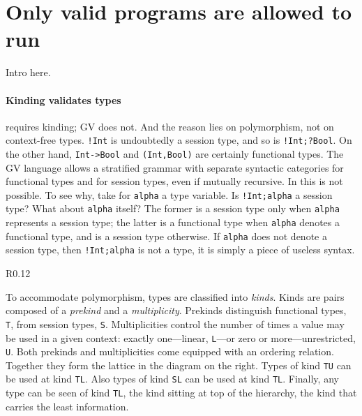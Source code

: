\section{Only valid programs are allowed to run}
\label{sec:valid}

Intro here.



\paragraph{Kinding validates types}

\freest{} requires kinding; GV does not. And the reason lies on
polymorphism, not on context-free types.
%
\lstinline|!Int| is undoubtedly a session type, and so is
\lstinline|!Int;?Bool|. On the other hand, \lstinline|Int->Bool| and
\lstinline|(Int,Bool)| are certainly functional types. The GV language
allows a stratified grammar with separate syntactic categories for
functional types and for session types, even if mutually recursive.
%
In \freest{} this is not possible.  To see why, take for
\lstinline|alpha| a type variable. Is \lstinline|!Int;alpha| a
session type? What about \lstinline|alpha| itself? The former is a
session type only when \lstinline|alpha| represents a session type;
the latter is a functional type when \lstinline|alpha| denotes a
functional type, and is a session type otherwise. If \lstinline|alpha|
does not denote a session type, then \lstinline|!Int;alpha| is not a
type, it is simply a piece of useless syntax.

\begin{wrapfigure}{R}{0.12\textwidth}
\end{wrapfigure}
%
To accommodate polymorphism, types are classified into \emph{kinds}.
%
Kinds are pairs composed of a \emph{prekind} and a
\emph{multiplicity}. Prekinds distinguish functional types,
\lstinline|T|, from session types, \lstinline|S|.
%
Multiplicities control the number of times a value may be used in a
given context: exactly one---linear, \lstinline|L|---or zero or
more---unrestricted, \lstinline|U|. Both prekinds and multiplicities
come equipped with an ordering relation. Together they form the
lattice in the diagram on the right.
%
Types of kind \lstinline|TU| can be used at kind \lstinline|TL|. Also
types of kind \lstinline|SL| can be used at kind \lstinline|TL|.
Finally, any type can be seen of kind \lstinline|TL|, the kind sitting
at top of the hierarchy, the kind that carries the least information.

